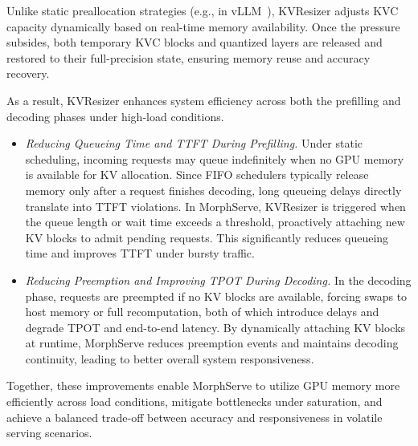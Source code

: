 \documentclass{article}
\newcommand{\system}{{MorphServe}\xspace}
\newcommand{\kvc}{\small\textsf{KVResizer}\xspace}
\newcommand{\bl}[1]{\textcolor{blue}{#1}}
\begin{document}
{Unlike static preallocation strategies (e.g., in vLLM~\cite{kwon2023efficient_vllm}), {\kvc} adjusts KVC capacity dynamically based on real-time memory availability. Once the pressure subsides, both temporary KVC blocks and quantized layers are released and restored to their full-precision state, ensuring memory reuse and accuracy recovery.

As a result, {\kvc} enhances system efficiency across both the prefilling and decoding phases under high-load conditions.

\begin{itemize}[leftmargin=*]
    \item \textit{Reducing Queueing Time and TTFT During Prefilling.}  
    Under static scheduling, incoming requests may queue indefinitely when no GPU memory is available for KV allocation. Since FIFO schedulers typically release memory only after a request finishes decoding, long queueing delays directly translate into TTFT violations. In {\system}, {\kvc} is triggered when the queue length or wait time exceeds a threshold, proactively attaching new KV blocks to admit pending requests. This significantly reduces queueing time and improves TTFT under bursty traffic.

    \item \textit{Reducing Preemption and Improving TPOT During Decoding.}  
    In the decoding phase, requests are preempted if no KV blocks are available, forcing swaps to host memory or full recomputation, both of which introduce delays and degrade TPOT and end-to-end latency. By dynamically attaching KV blocks at runtime, {\system} reduces preemption events and maintains decoding continuity, leading to better overall system responsiveness.
\end{itemize}\vspace{-10pt} 

Together, these improvements enable {\system} to utilize GPU memory more efficiently across load conditions, mitigate bottlenecks under saturation, and achieve a balanced trade-off between accuracy and responsiveness in volatile serving scenarios.


}
\end{document}
